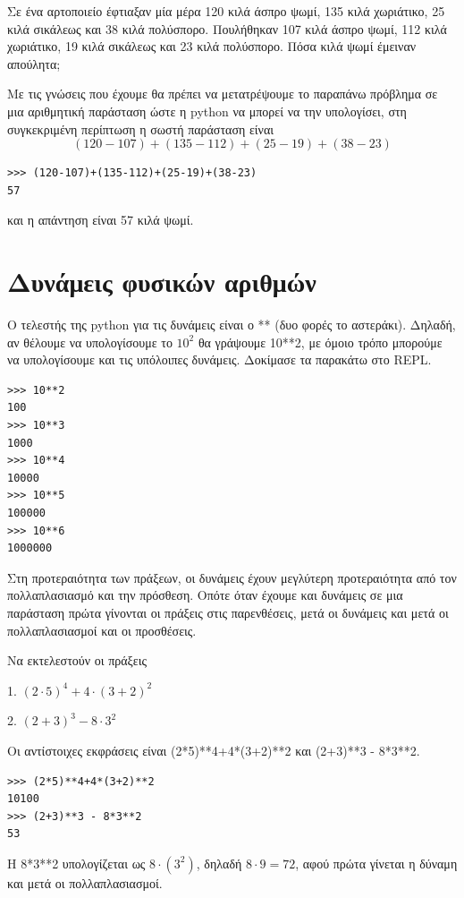 \begin{exercise}
Σε ένα αρτοποιείο έφτιαξαν μία μέρα 120 κιλά άσπρο ψωμί, 135 κιλά χωριάτικο, 25 κιλά σικάλεως και 38 κιλά πολύσπορο. Πουλήθηκαν 107 κιλά άσπρο ψωμί, 112 κιλά χωριάτικο, 19 κιλά σικάλεως και 23 κιλά πολύσπορο. Πόσα κιλά ψωμί έμειναν απούλητα;
\end{exercise}
Με τις γνώσεις που έχουμε θα πρέπει να μετατρέψουμε το παραπάνω πρόβλημα σε μια αριθμητική παράσταση ώστε η python να μπορεί να την υπολογίσει, στη συγκεκριμένη περίπτωση η σωστή παράσταση είναι $$(120-107)+(135-112)+(25-19)+(38-23)$$
\begin{lstlisting}
>>> (120-107)+(135-112)+(25-19)+(38-23)
57
\end{lstlisting}
και η απάντηση είναι 57 κιλά ψωμί.

\section{Δυνάμεις φυσικών αριθμών}
Ο τελεστής της python για τις δυνάμεις είναι ο **  (δυο φορές το αστεράκι). Δηλαδή, αν θέλουμε να υπολογίσουμε το $10^2$ θα γράψουμε 10**2, με όμοιο τρόπο μπορούμε να υπολογίσουμε και τις υπόλοιπες δυνάμεις. Δοκίμασε τα παρακάτω στο REPL.
\begin{lstlisting}
>>> 10**2
100
>>> 10**3
1000
>>> 10**4
10000
>>> 10**5
100000
>>> 10**6
1000000
\end{lstlisting}
Στη προτεραιότητα των πράξεων, οι δυνάμεις έχουν μεγλύτερη προτεραιότητα από τον πολλαπλασιασμό και την πρόσθεση. Οπότε όταν έχουμε και δυνάμεις σε μια παράσταση πρώτα γίνονται οι πράξεις στις παρενθέσεις, μετά οι δυνάμεις και μετά οι πολλαπλασιασμοί και οι προσθέσεις.
\begin{exercise}
Να εκτελεστούν οι πράξεις 

 1. $(2\cdot 5)^4+4\cdot (3+2)^2$

 2. $(2+3)^3 - 8\cdot 3^2$

\end{exercise}
Οι αντίστοιχες εκφράσεις είναι (2*5)**4+4*(3+2)**2 και (2+3)**3 - 8*3**2.

\begin{lstlisting}
>>> (2*5)**4+4*(3+2)**2
10100
>>> (2+3)**3 - 8*3**2
53
\end{lstlisting}
H 8*3**2 υπολογίζεται ως $8\cdot (3^2)$, δηλαδή $8\cdot 9 = 72$, αφού πρώτα γίνεται η δύναμη και μετά οι πολλαπλασιασμοί.

